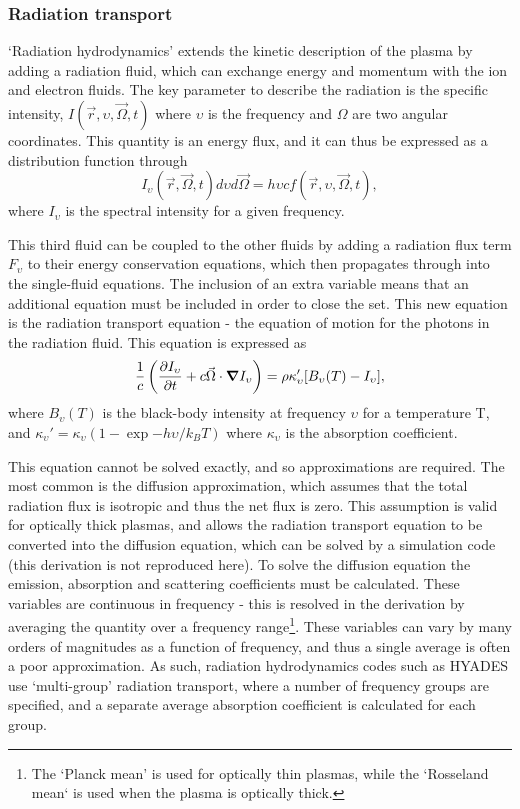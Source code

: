 \subsubsection{Radiation transport}
`Radiation hydrodynamics' extends the kinetic description of the plasma by adding a radiation fluid, which can exchange energy and momentum with the ion and electron fluids. The key parameter to describe the radiation is the specific intensity, $I(\vec{r}, \upsilon, \vec{\Omega}, t)$ where $\upsilon$ is the frequency and $\Omega$ are two angular coordinates. This quantity is an energy flux, and it can thus be expressed as a distribution function through 
\begin{equation} I_{\upsilon}(\vec{r}, \vec{\Omega}, t) d\upsilon d\vec{\Omega} = h \upsilon c f(\vec{r}, \upsilon, \vec{\Omega}, t), \end{equation}
where $I_{\upsilon}$ is the spectral intensity for a given frequency.

This third fluid can be coupled to the other fluids by adding a radiation flux term $F_{\upsilon}$ to their energy conservation equations, which then propagates through into the single-fluid equations. The inclusion of an extra variable means that an additional equation must be included in order to close the set. This new equation is the radiation transport equation - the equation of motion for the photons in the radiation fluid. This equation is expressed as 
\begin{equation} \frac{1}{c} \left( \frac{\partial I_\upsilon}{\partial t} + c \vec{\Omega} \cdot \grad I_{\upsilon} \right) = \rho \kappa_\upsilon' [B_\upsilon (T) - I_\upsilon], \end{equation} where $B_\upsilon (T)$ is the black-body intensity at frequency $\upsilon$ for a temperature T, and $\kappa_\upsilon' = \kappa_\upsilon ( 1 - \exp{-h\upsilon / k_B T})$ where $\kappa_\upsilon$ is the absorption coefficient.

This equation cannot be solved exactly, and so approximations are required. The most common is the diffusion approximation, which assumes that the total radiation flux is isotropic and thus the net flux is zero. This assumption is valid for optically thick plasmas, and allows the radiation transport equation to be converted into the diffusion equation, which can be solved by a simulation code (this derivation is not reproduced here). To solve the diffusion equation the emission, absorption and scattering coefficients must be calculated. These variables are continuous in frequency - this is resolved in the derivation by averaging the quantity over a frequency range\footnote{The `Planck mean' is used for optically thin plasmas, while the `Rosseland mean` is used when the plasma is optically thick.}. These variables can vary by many orders of magnitudes as a function of frequency, and thus a single average is often a poor approximation. As such, radiation hydrodynamics codes such as HYADES use `multi-group' radiation transport, where a number of frequency groups are specified, and a separate average absorption coefficient is calculated for each group.

